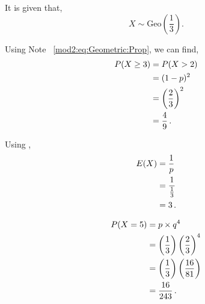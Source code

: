 \begin{subquestions}
\begin{subsubquestions}
\end{subsubquestions}


\subquestion

It is given that,
\begin{equation}
	X \sim \text{Geo}\left(\frac{1}{3}\right).
\end{equation}

\begin{subsubquestions}

\subsubquestion
Using Note ~\ref{mod2:eq:Geometric:Prop}, we can find,
\begin{align}
	P(X \geq 3) & = P(X > 2) \nonumber \\
				& = (1-p)^2 \nonumber \\
	            & = \left(\frac{2}{3} \right)^2 \nonumber \\
	            & = \frac{4}{9} \,.
\end{align}


\subsubquestion
Using ,
\begin{align}
	E(X) & = \frac{1}{p} \nonumber \\
	     & = \frac{1}{\frac{1}{3}} \nonumber \\
	     & = 3 \,.
\end{align}


\subsubquestion

\begin{align}
	P(X=5) & = p \times q^4 \nonumber \\
	       & = \left(\frac{1}{3} \right) \left(\frac{2}{3} \right)^4 \nonumber \\
	       & = \left(\frac{1}{3} \right) \left(\frac{16}{81} \right) \nonumber \\
           & = \frac{16}{243} \,. 
\end{align}

\end{subsubquestions}



\end{subquestions}
